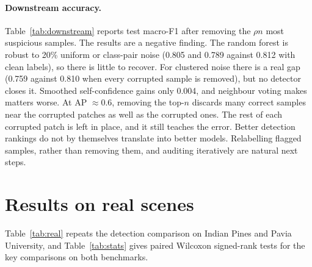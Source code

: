 \documentclass[11pt]{article}
\begin{document}
\paragraph{Downstream accuracy.}
Table~\ref{tab:downstream} reports test macro-F1 after removing the $\rho n$
most suspicious samples. The results are a negative finding. The random forest
is robust to 20\% uniform or class-pair noise (0.805 and 0.789 against 0.812 with
clean labels), so there is little to recover. For clustered noise there is a real
gap (0.759 against 0.810 when every corrupted sample is removed), but no detector
closes it. Smoothed self-confidence gains only 0.004, and neighbour voting makes
matters worse. At AP $\approx 0.6$, removing the top-$n$ discards many correct
samples near the corrupted patches as well as the corrupted ones. The rest of each
corrupted patch is left in place, and it still teaches the error. Better
detection rankings do not by themselves translate into better models. Relabelling
flagged samples, rather than removing them, and auditing iteratively are natural
next steps.

\begin{table}[t]
\centering\small
\caption{Test macro-F1 on clean labels after removing the top-$n$ suspicious
training samples ($n$ = true error count), 20\% error rate, spectral\,+\,x,y
features (mean $\pm$ s.d.\ over 5 seeds).}
\label{tab:downstream}
\resizebox{\linewidth}{!}{}
\end{table}

\section{Results on real scenes}
\label{sec:real}

Table~\ref{tab:real} repeats the detection comparison on Indian Pines and Pavia
University, and Table~\ref{tab:stats} gives paired Wilcoxon signed-rank tests for
the key comparisons on both benchmarks.

\begin{table}[t]
\centering\small
\caption{Average precision for ranking corrupted labels on the real scenes at a
20\% injected error rate (mean $\pm$ s.d.\ over 5 seeds; chance $=0.20$). Bold marks
the best entry per column and scene.}
\label{tab:real}
\resizebox{\linewidth}{!}{}
\end{table}

\begin{table}[t]
\centering\small
\caption{Paired comparisons of average precision at a 20\% error rate. Each cell
gives the median difference $a-b$, the number of paired runs where $a$ wins, and
the two-sided Wilcoxon signed-rank $p$-value. Synthetic pairs are
3 rates $\times$ 5 seeds; real pairs are 2 scenes $\times$ 5 seeds.}
\label{tab:stats}
\resizebox{\linewidth}{!}{}
\end{table}
\end{document}
